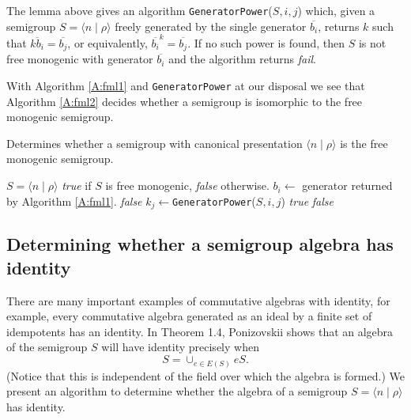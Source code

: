 \documentclass[12pt]{article}
\begin{document}
The lemma above gives an algorithm {\tt GeneratorPower}($S,i, j$)
which, given a semigroup $S = \langle n \mid \rho \rangle$
freely generated by the single generator $\overline{b_i}$, returns $k$ such
that $\overline{kb_i} = \overline{b_j}$, or equivalently,
$\overline{b_i}^k = \overline{b_j}$. If no such power is found, then
$S$ is not free monogenic with generator $\overline{b_i}$ and the algorithm 
returns \emph{fail}.

With Algorithm  \ref{A:fml1} and {\tt GeneratorPower} at our disposal 
we see that Algorithm \ref{A:fml2} decides whether  a semigroup is
isomorphic to the free monogenic semigroup.
\begin{algorithm}
\caption{Determines whether a semigroup with canonical presentation
$\langle n \mid \rho \rangle$ is the free monogenic semigroup.}
\label{A:fml2}
\begin{algorithmic}[1]
\REQUIRE $S = \langle n \mid \rho \rangle$  
\ENSURE \emph{true} if $S$ is free monogenic, \emph{false} otherwise.
\ELSE
        \STATE $b_i \leftarrow $ generator returned by Algorithm \ref{A:fml1}.
\ENDIF
{}
                 \emph{false}
        \ELSE
                \STATE $k_j \leftarrow ${\tt GeneratorPower}($S,i, j$)
        \ENDIF
\ENDFOR
\STATE {}
         \emph{true}
\ELSE
         \emph{false}
\ENDIF
\end{algorithmic}
\end{algorithm}

\subsection{Determining whether a semigroup algebra has identity}

There are many important examples of commutative algebras with
identity, for example, every commutative algebra generated as an ideal 
by a finite set of idempotents has an identity.
In \cite{poniz87} Theorem 1.4, Ponizovskii shows that an algebra 
of the semigroup $S$ will have identity precisely when 
\begin{equation}\label{eq:hasid}
S = \cup_{e \in E(S)}eS.
\end{equation}
(Notice that this is independent of the 
field over which the algebra is formed.)
We present an algorithm to determine whether
the algebra of a semigroup $S = \langle n \mid \rho\rangle$ has 
identity.
\end{document}
